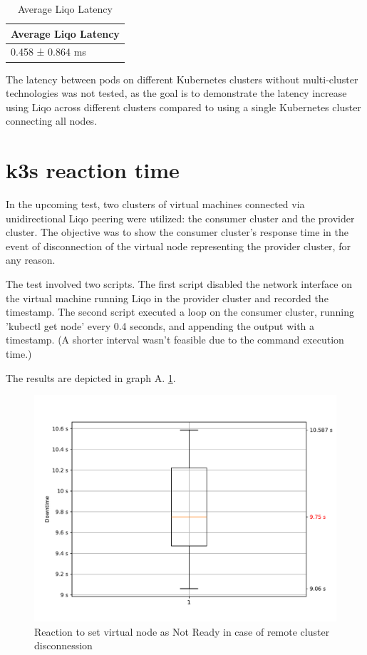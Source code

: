 \begin{table}[ht]              
\centering 
\begin{tabular}{|l|}
\hline
\textbf{Average Liqo Latency} \\ 
\hline
0.458 ± 0.864 ms \\
\hline
\end{tabular}
\caption{Average Liqo Latency} \label{t:5}  
\end{table}

The latency between pods on different Kubernetes clusters without multi-cluster technologies was not tested, as the goal is to demonstrate the latency increase using Liqo across different clusters compared to using a single Kubernetes cluster connecting all nodes.

\section{k3s reaction time}

In the upcoming test, two clusters of virtual machines connected via unidirectional Liqo peering were utilized: the consumer cluster and the provider cluster. The objective was to show the consumer cluster's response time in the event of disconnection of the virtual node representing the provider cluster, for any reason.

The test involved two scripts. The first script disabled the network interface on the virtual machine running Liqo in the provider cluster and recorded the timestamp. The second script executed a loop on the consumer cluster, running 'kubectl get node' every 0.4 seconds, and appending the output with a timestamp. (A shorter interval wasn't feasible due to the command execution time.)

The results are depicted in graph A. \ref{graph:k-reaction}.

\begin{figure}[!htb]\centering
\includegraphics[scale=0.5]{Pictures/k3s-reaction}
\caption{Reaction to set virtual node as Not Ready in case of remote cluster disconnession}\label{graph:k-reaction}
\end{figure}

